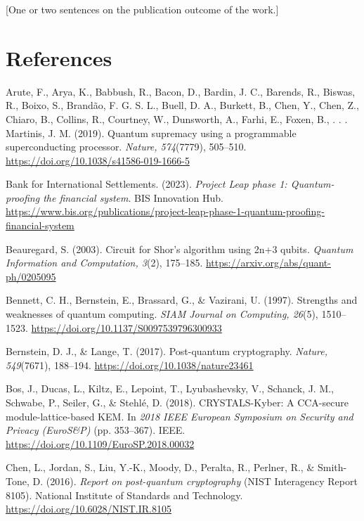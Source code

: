 \documentclass[12pt,oneside]{report}
\begin{document}
[One or two sentences on the publication outcome of the work.]
\par

\section*{References}

Arute, F., Arya, K., Babbush, R., Bacon, D., Bardin, J. C., Barends, R., Biswas, R., Boixo, S., Brandão, F. G. S. L., Buell, D. A., Burkett, B., Chen, Y., Chen, Z., Chiaro, B., Collins, R., Courtney, W., Dunsworth, A., Farhi, E., Foxen, B., . . . Martinis, J. M. (2019). Quantum supremacy using a programmable superconducting processor. \textit{Nature, 574}(7779), 505–510. \url{https://doi.org/10.1038/s41586-019-1666-5}
\par

Bank for International Settlements. (2023). \textit{Project Leap phase 1: Quantum-proofing the financial system}. BIS Innovation Hub. \url{https://www.bis.org/publications/project-leap-phase-1-quantum-proofing-financial-system}
\par

Beauregard, S. (2003). Circuit for Shor's algorithm using 2n+3 qubits. \textit{Quantum Information and Computation, 3}(2), 175–185. \url{https://arxiv.org/abs/quant-ph/0205095}
\par

Bennett, C. H., Bernstein, E., Brassard, G., \& Vazirani, U. (1997). Strengths and weaknesses of quantum computing. \textit{SIAM Journal on Computing, 26}(5), 1510–1523. \url{https://doi.org/10.1137/S0097539796300933}
\par

Bernstein, D. J., \& Lange, T. (2017). Post-quantum cryptography. \textit{Nature, 549}(7671), 188–194. \url{https://doi.org/10.1038/nature23461}
\par

Bos, J., Ducas, L., Kiltz, E., Lepoint, T., Lyubashevsky, V., Schanck, J. M., Schwabe, P., Seiler, G., \& Stehlé, D. (2018). CRYSTALS-Kyber: A CCA-secure module-lattice-based KEM. In \textit{2018 IEEE European Symposium on Security and Privacy (EuroS\&P)} (pp. 353–367). IEEE. \url{https://doi.org/10.1109/EuroSP.2018.00032}
\par

Chen, L., Jordan, S., Liu, Y.-K., Moody, D., Peralta, R., Perlner, R., \& Smith-Tone, D. (2016). \textit{Report on post-quantum cryptography} (NIST Interagency Report 8105). National Institute of Standards and Technology. \url{https://doi.org/10.6028/NIST.IR.8105}
\par
\end{document}
